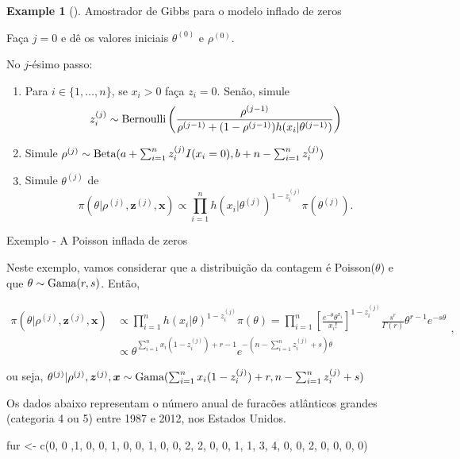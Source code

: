 \documentclass[
  letterpaper,
  DIV=11,
  numbers=noendperiod]{scrreprt}
\newenvironment{Shaded}{\begin{snugshade}}{\end{snugshade}}
\newcommand{\DecValTok}[1]{\textcolor[rgb]{0.68,0.00,0.00}{#1}}
\newcommand{\FunctionTok}[1]{\textcolor[rgb]{0.28,0.35,0.67}{#1}}
\newcommand{\NormalTok}[1]{\textcolor[rgb]{0.00,0.23,0.31}{#1}}
\newcommand{\OtherTok}[1]{\textcolor[rgb]{0.00,0.23,0.31}{#1}}
\theoremstyle{definition}
\theoremstyle{plain}
\theoremstyle{definition}
\newtheorem{example}{Example}[chapter]
\theoremstyle{remark}
\begin{document}
\begin{example}[]
Amostrador de Gibbs para o modelo inflado de zeros

Faça \(j=0\) e dê os valores iniciais \(\theta^{(0)}\) e \(\rho^{(0)}\).

No \(j\)-ésimo passo:

\begin{enumerate}
\def\labelenumi{\arabic{enumi}.}
\item
  Para \(i\in\{1,\ldots,n\}\), se \(x_i>0\) faça \(z_i=0\). Senão,
  simule
  \[z_i^{(j)}\sim \hbox{Bernoulli}\left(\frac{\rho^{(j-1)}}{\rho^{(j-1)}+(1-\rho^{(j-1)})h(x_i|\theta^{(j-1)})}\right)\]
\item
  Simule
  \(\rho^{(j)}\sim\hbox{Beta}(a+\sum_{i=1}^n z_i^{(j)}I(x_i=0),b+n-\sum_{i=1}^n z_i^{(j)})\)
\item
  Simule \(\theta^{(j)}\) de
  \[\pi(\theta|\rho^{(j)},\boldsymbol{z}^{(j)},\boldsymbol{x})\propto \prod_{i=1}^n h(x_i|\theta^{(j)})^{1-z_i^{(j)}}\pi(\theta^{(j)}).\]
\end{enumerate}

Exemplo - A Poisson inflada de zeros

Neste exemplo, vamos considerar que a distribuição da contagem é
Poisson(\(\theta\)) e que \(\theta\sim\hbox{Gama}(r,s)\). Então,

\[\begin{align}
\pi(\theta|\rho^{(j)},\boldsymbol{z}^{(j)},\boldsymbol{x})&\propto \prod_{i=1}^{n} h(x_{i} | \theta )^{ 1-z_{i}^{(j)} }\pi(\theta)= 
 \prod_{i=1}^{n} \left[\frac{ e^{-\theta}\theta^{x_i} }{x_i!}\right]^{1-z_{i}^{(j)}}\frac{s^r}{\Gamma(r)}\theta^{r-1} e^{-s\theta}\\&\propto \theta^{\sum_{i=1}^n x_i(1-z_i^{(j)})+r-1}e^{-(n-\sum_{i=1}^n z_i^{(j)}+s)\theta}
 \end{align},\]

ou seja,
\(\theta^{(j)}|\rho^{(j)},\boldsymbol{z}^{(j)},\boldsymbol{x}\sim\hbox{Gama}(\sum_{i=1}^n x_i(1-z_i^{(j)})+r,n-\sum_{i=1}^n z_i^{(j)}+s)\)

Os dados abaixo representam o número anual de furacões atlânticos
grandes (categoria 4 ou 5) entre 1987 e 2012, nos Estados Unidos.

\begin{Shaded}
\begin{Highlighting}[]
\NormalTok{fur }\OtherTok{\textless{}{-}}  \FunctionTok{c}\NormalTok{(}\DecValTok{0}\NormalTok{, }\DecValTok{0}\NormalTok{ ,}\DecValTok{1}\NormalTok{,}
\DecValTok{0}\NormalTok{, }\DecValTok{0}\NormalTok{, }\DecValTok{1}\NormalTok{, }\DecValTok{0}\NormalTok{, }\DecValTok{0}\NormalTok{, }\DecValTok{1}\NormalTok{, }\DecValTok{0}\NormalTok{, }\DecValTok{0}\NormalTok{, }\DecValTok{2}\NormalTok{, }\DecValTok{2}\NormalTok{,}
\DecValTok{0}\NormalTok{, }\DecValTok{0}\NormalTok{, }\DecValTok{1}\NormalTok{, }\DecValTok{1}\NormalTok{, }\DecValTok{3}\NormalTok{, }\DecValTok{4}\NormalTok{, }\DecValTok{0}\NormalTok{, }\DecValTok{0}\NormalTok{, }\DecValTok{2}\NormalTok{, }\DecValTok{0}\NormalTok{,}
\DecValTok{0}\NormalTok{, }\DecValTok{0}\NormalTok{, }\DecValTok{0}\NormalTok{)}
\end{Highlighting}
\end{Shaded}


\end{example}
\end{document}
